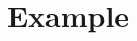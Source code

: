 \documentclass[a4paper]{article}
\title{Example}
\begin{document}
\blindtext{}
\newpage
\blindtext{}
\end{document}
